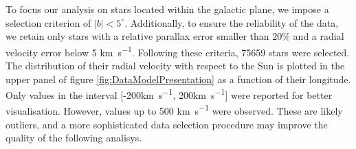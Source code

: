 To focus our analysis on stars located within the galactic plane, we impose a selection criterion of $\vert b \vert < 5^{\circ}$. Additionally, to ensure the reliability of the data, we retain only stars with a relative parallax error smaller than 20$\%$ and a radial velocity error below 5 \unit{\kilo\meter\per\second}. Following these criteria, 75659 stars were selected. The distribution of their radial velocity with respect to the Sun is plotted in the upper panel of figure \ref{fig:DataModelPresentation} as a function of their longitude. Only values in the interval [-200\unit{\kilo\meter\per\second}, 200\unit{\kilo\meter\per\second}] were reported for better visualisation. However, values up to 500 \unit{\kilo\meter\per\second} were observed. These are likely outliers, and a more sophisticated data selection procedure may improve the quality of the following analisys.
